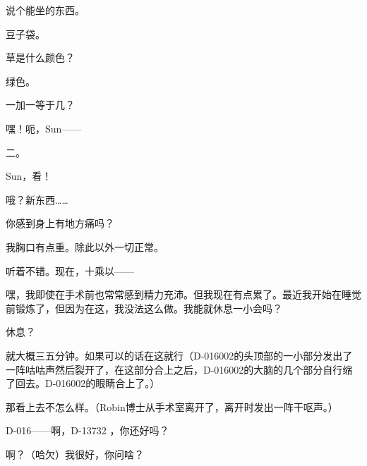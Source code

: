 \begin{scpbox}
说个能坐的东西。

豆子袋。

草是什么颜色？

绿色。

一加一等于几？


嘿！呃，Sun——

二。

Sun，看！


哦？新东西……

你感到身上有地方痛吗？

我胸口有点重。除此以外一切正常。

听着不错。现在，十乘以——

嘿，我即使在手术前也常常感到精力充沛。但我现在有点累了。最近我开始在睡觉前锻炼了，但因为在这，我没法这么做。我能就休息一小会吗？

休息？

就大概三五分钟。如果可以的话在这就行（D-016002的头顶部的一小部分发出了一阵咕咕声然后裂开了，在这部分合上之后，D-016002的大脑的几个部分自行缩了回去。D-016002的眼睛合上了。）

那看上去不怎么样。（Robin博士从手术室离开了，离开时发出一阵干呕声。）

D-016——啊，D-13732 ，你还好吗？

啊？（哈欠）我很好，你问啥？

\end{scpbox}
